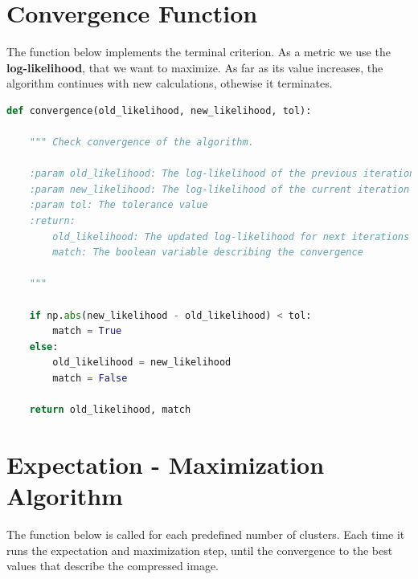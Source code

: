 \documentclass[11pt]{article}
\begin{document}
\section{Convergence Function}
The function below implements the terminal criterion. As a metric we use the \textbf{log-likelihood}, that we want to maximize. As far as its value increases, the algorithm continues with new calculations, othewise it terminates.


\begin{lstlisting}[language = Python]
def convergence(old_likelihood, new_likelihood, tol):
    
    """ Check convergence of the algorithm.
    
    :param old_likelihood: The log-likelihood of the previous iteration
    :param new_likelihood: The log-likelihood of the current iteration
    :param tol: The tolerance value 
    :return:
        old_likelihood: The updated log-likelihood for next iterations
        match: The boolean variable describing the convergence
        
    """
    
    if np.abs(new_likelihood - old_likelihood) < tol:
        match = True
    else:
        old_likelihood = new_likelihood
        match = False
        
    return old_likelihood, match
    \end{lstlisting}
    
    \section{Expectation - Maximization Algorithm}
The function below is called for each predefined number of clusters. Each time it runs the expectation and maximization step, until the convergence to the best values that describe the compressed image.
\end{document}
